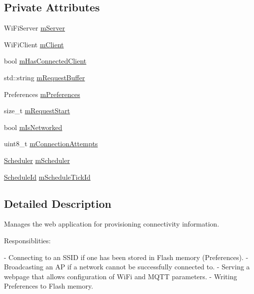\subsection*{Private Attributes}
\begin{DoxyCompactItemize}
\item 
Wi\+Fi\+Server \mbox{\hyperlink{class_wi_fi_provisioning_a88e571f1efd1e428e43209112b8c7171}{m\+Server}}
\item 
Wi\+Fi\+Client \mbox{\hyperlink{class_wi_fi_provisioning_a1a54c3ca59fb3c3cc9c0762a90ac19b8}{m\+Client}}
\item 
bool \mbox{\hyperlink{class_wi_fi_provisioning_a48db3ee3b21d4fa713871b0dda70aa8b}{m\+Has\+Connected\+Client}}
\item 
std\+::string \mbox{\hyperlink{class_wi_fi_provisioning_a1f5a015d51939cb267c52cf8e2343925}{m\+Request\+Buffer}}
\item 
Preferences \mbox{\hyperlink{class_wi_fi_provisioning_a7008915e029e3ccaa96d3a90cb54b23f}{m\+Preferences}}
\item 
size\+\_\+t \mbox{\hyperlink{class_wi_fi_provisioning_ac1a07586d838aaba494f632fbc860720}{m\+Request\+Start}}
\item 
bool \mbox{\hyperlink{class_wi_fi_provisioning_a4866e3ed981a3c39bd68019704e19334}{m\+Is\+Networked}}
\item 
uint8\+\_\+t \mbox{\hyperlink{class_wi_fi_provisioning_a9dbf21d2662da425ce4e5fc04f25baac}{m\+Connection\+Attempts}}
\item 
\mbox{\hyperlink{class_scheduler}{Scheduler}} \mbox{\hyperlink{class_wi_fi_provisioning_a526e09058cb137d8b5b05830584317d8}{m\+Scheduler}}
\item 
\mbox{\hyperlink{_scheduler_8h_a1e3b4605bdcbb8f6df7c47013e26e910}{Schedule\+Id}} \mbox{\hyperlink{class_wi_fi_provisioning_a53fd157ea3bae357292188eba8dc81b6}{m\+Schedule\+Tick\+Id}}
\end{DoxyCompactItemize}


\subsection{Detailed Description}
Manages the web application for provisioning connectivity information. 

Responsiblities\+: \begin{DoxyVerb}- Connecting to an SSID if one has been stored in Flash memory
  (Preferences).
- Broadcasting an AP if a network cannot be successfully connected to.
- Serving a webpage that allows configuration of WiFi and MQTT
  parameters.
- Writing Preferences to Flash memory.\end{DoxyVerb}
 

